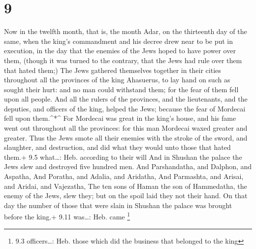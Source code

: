 \hypertarget{section-8}{%
\section{9}\label{section-8}}

 Now in the twelfth month, that is, the month Adar, on the
thirteenth day of the same, when the king's commandment and his decree
drew near to be put in execution, in the day that the enemies of the
Jews hoped to have power over them, (though it was turned to the
contrary, that the Jews had rule over them that hated them;)
 The Jews gathered themselves together in their cities
throughout all the provinces of the king Ahasuerus, to lay hand on such
as sought their hurt: and no man could withstand them; for the fear of
them fell upon all people.  And all the rulers of the
provinces, and the lieutenants, and the deputies, and officers of the
king, helped the Jews; because the fear of Mordecai fell upon
them.\^{}*\^{}  For Mordecai was great in the king's house,
and his fame went out throughout all the provinces: for this man
Mordecai waxed greater and greater.  Thus the Jews smote all
their enemies with the stroke of the sword, and slaughter, and
destruction, and did what they would unto those that hated them.+ 9.5
what\ldots: Heb. according to their will  And in Shushan the
palace the Jews slew and destroyed five hundred men.  And
Parshandatha, and Dalphon, and Aspatha,  And Poratha, and
Adalia, and Aridatha,  And Parmashta, and Arisai, and
Aridai, and Vajezatha,  The ten sons of Haman the son of
Hammedatha, the enemy of the Jews, slew they; but on the spoil laid they
not their hand.  On that day the number of those that were
slain in Shushan the palace was brought before the king.+ 9.11
was\ldots: Heb. came \footnote{9.3 officers\ldots: Heb. those which did
  the business that belonged to the king}


